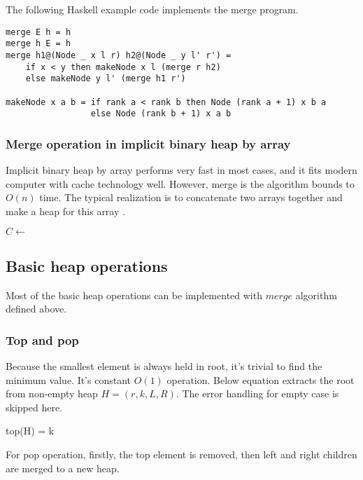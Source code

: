 \documentclass{article}
\begin{document}
The following Haskell example code implements the merge program.

\lstset{language=Haskell}
\begin{lstlisting}
merge E h = h
merge h E = h
merge h1@(Node _ x l r) h2@(Node _ y l' r') =
    if x < y then makeNode x l (merge r h2)
    else makeNode y l' (merge h1 r')

makeNode x a b = if rank a < rank b then Node (rank a + 1) x b a
                 else Node (rank b + 1) x a b
\end{lstlisting}

\subsubsection{Merge operation in implicit binary heap by array}

Implicit binary heap by array performs very fast in most cases, and
it fits modern computer with cache technology well. However, merge
is the algorithm bounds to $O(n)$ time. The typical realization is to
concatenate two arrays together and make a heap for this array \cite{NIST}.

\begin{algorithmic}[1]
  \State $C \gets$ 
  \State {}
\EndFunction
\end{algorithmic}

\subsection{Basic heap operations}

Most of the basic heap operations can be implemented with $merge$
algorithm defined above.

\subsubsection{Top and pop}
Because the smallest element is always held in root, it's trivial
to find the minimum value. It's constant $O(1)$ operation. Below
equation extracts the root from non-empty heap $H = (r, k, L, R)$.
The error handling for empty case is skipped here.

\be
top(H) = k
\ee

For pop operation, firstly, the top element is removed, then
left and right children are merged to a new heap.
\end{document}
